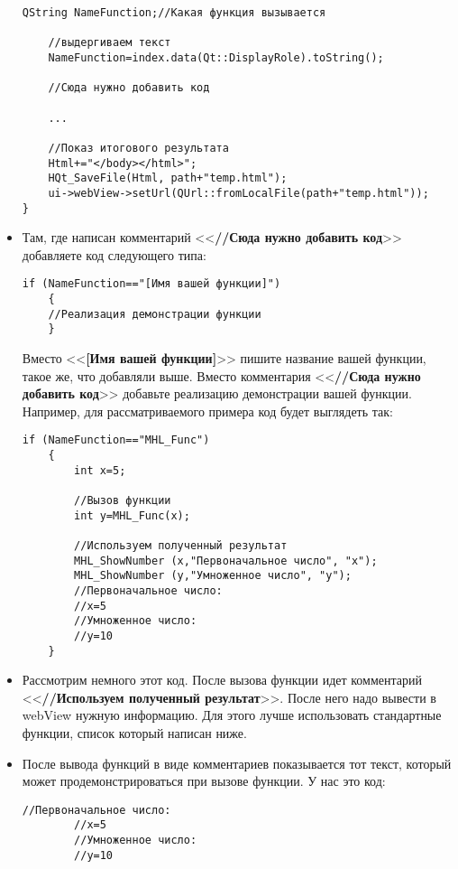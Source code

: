 \begin{itemize}
\begin{lstlisting}[label=examplefunction06, caption=MainWindow::on\_listView\_clicked]
    QString NameFunction;//Какая функция вызывается

    //выдергиваем текст
    NameFunction=index.data(Qt::DisplayRole).toString();

	//Сюда нужно добавить код 

	...

    //Показ итогового результата
    Html+="</body></html>";
    HQt_SaveFile(Html, path+"temp.html");
    ui->webView->setUrl(QUrl::fromLocalFile(path+"temp.html"));
}
\end{lstlisting}
\item Там, где написан комментарий <<\textbf{//Сюда нужно добавить код}>> добавляете код следующего типа:
\begin{lstlisting}[label=examplefunction07, caption=Добавление демонстрации работы функции]
    if (NameFunction=="[Имя вашей функции]")
    {
	//Реализация демонстрации функции
    }
\end{lstlisting}
Вместо <<\textbf{[Имя вашей функции]}>> пишите название вашей функции, такое же, что добавляли выше. Вместо комментария <<\textbf{//Сюда нужно добавить код}>> добавьте реализацию демонстрации вашей функции. Например, для рассматриваемого примера код будет выглядеть так:
\begin{lstlisting}[label=examplefunction08, caption=Добавление демонстрации работы функции на примере]
    if (NameFunction=="MHL_Func")
    {
        int x=5;

        //Вызов функции
        int y=MHL_Func(x);

        //Используем полученный результат
        MHL_ShowNumber (x,"Первоначальное число", "x");
        MHL_ShowNumber (y,"Умноженное число", "y");
        //Первоначальное число:
        //x=5
        //Умноженное число:
        //y=10
    }
\end{lstlisting}
\item Рассмотрим немного этот код. После вызова функции идет комментарий <<\textbf{//Используем полученный результат}>>. После него надо вывести в webView нужную информацию. Для этого лучше использовать стандартные функции, список который написан ниже.
\item  После вывода функций в виде комментариев показывается тот текст, который может продемонстрироваться при вызове функции. У нас это код:
\begin{lstlisting}[label=examplefunction09, caption=Закомментированный результат работы функции]
        //Первоначальное число:
        //x=5
        //Умноженное число:
        //y=10
\end{lstlisting}
\end{itemize}

